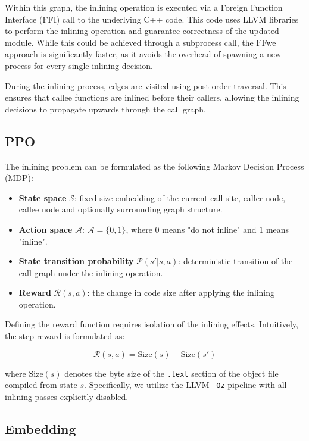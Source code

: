 \documentclass{article}
\theoremstyle{plain}
\theoremstyle{definition}
\theoremstyle{remark}
\begin{document}
Within this graph, the inlining operation is executed via a Foreign Function Interface (FFI) call to the underlying C++ code. This code uses LLVM libraries to perform the inlining operation and guarantee correctness of the updated module. While this could be achieved through a subprocess call, the FFwe approach is significantly faster, as it avoids the overhead of spawning a new process for every single inlining decision.

During the inlining process, edges are visited using post-order traversal. This ensures that callee functions are inlined before their callers, allowing the inlining decisions to propagate upwards through the call graph.

\subsection{PPO}

The inlining problem can be formulated as the following Markov Decision Process (MDP):

\begin{itemize}
    \item \textbf{State space} $\mathcal{S}$: fixed-size embedding of the current call site, caller node, callee node and optionally surrounding graph structure.
    \item \textbf{Action space} $\mathcal{A}$: $\mathcal{A} = \{0, 1\}$, where $0$ means "do not inline" and $1$ means "inline".
    \item \textbf{State transition probability} $\mathcal{P}(s'|s, a)$: deterministic transition of the call graph under the inlining operation.
    \item \textbf{Reward} $\mathcal{R}(s, a)$: the change in code size after applying the inlining operation.
\end{itemize}

Defining the reward function requires isolation of the inlining effects. Intuitively, the step reward is formulated as:

\begin{equation}
    \mathcal{R}(s, a) = \text{Size}(s) - \text{Size}(s')
\end{equation}

where $\text{Size}(s)$ denotes the byte size of the \verb|.text| section of the object file compiled from state $s$. Specifically, we utilize the LLVM \verb|-Oz| pipeline with all inlining passes explicitly disabled.

\subsection{Embedding}
\end{document}
